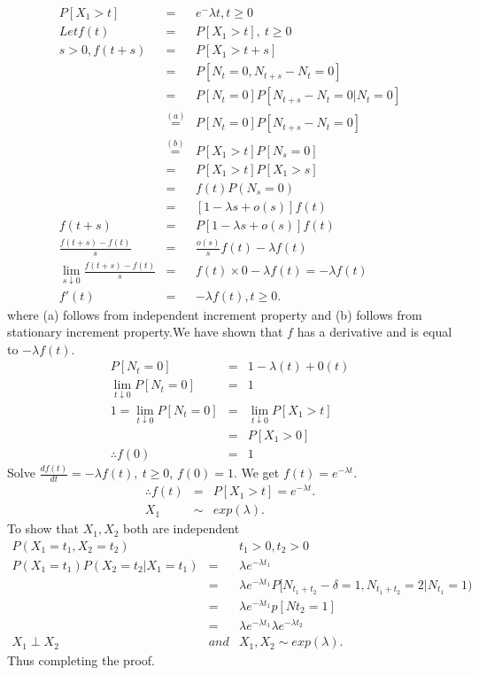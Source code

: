 \documentclass[11 pt]{article}
\theoremstyle{plain}
\theoremstyle{definition}
\theoremstyle{remark}
\begin{document}
\begin{eqnarray*}
  P[X_{1}>t] &=&  e^-\lambda t, t\geq 0\\
  Let f(t) &=& P[X_{1}>t],~ t\geq 0 \\
  s>0, f(t+s) &=&   P[X_{1}>t+s]\\
   &=& P[N_{t}=0, N_{t+s}-N_{t}=0]  \\
   &=& P[N_{t}=0] P[N_{t+s}-N_{t}=0|N_{t}=0 ] \\
   &\stackrel{(a)}{=}& P[N_{t}=0] P[ N_{t+s}-N_{t}=0]\\
   &\stackrel{(b)}{=}&  P[X_{1}>t] P[N_{s}=0]  \\
   &=& P[X_{1}>t] P[X_{1}>s] \\
   &=& f(t) P(N_{s}=0) \\
   &=& [1- \lambda s + o(s)] f(t) \\
  f(t+s) &=& P [1- \lambda s + o(s)] f(t)\\
  \frac{f(t+s)-f(t)}{s} &=& \frac{o(s)}{s}f(t)- \lambda f(t) \\
  \lim_{s\downarrow0}  \frac{f(t+s)-f(t)}{s}  &=& f(t) \times 0 - \lambda f(t) = -\lambda f(t) \\
 f'(t) &=& - \lambda f(t), t\geq 0.
\end{eqnarray*}
where (a) follows from independent increment property and (b) follows from stationary increment property.We have shown that $f$ has a derivative and is equal to $-\lambda f(t)$.\\
\begin{eqnarray*}
   P[N_{t}=0] &=& 1- \lambda (t)+ 0(t) \\
  \lim _{t\downarrow0}P[N_{t}=0] &=& 1 \\
  1= \lim _{t\downarrow0}P[N_{t}=0]&=& \lim _{t\downarrow0}P[X_{1}>t] \\
   &=& P[X_{1}>0]  \\
  \therefore f(0) &=& 1
  \end{eqnarray*}
  Solve $\frac{df(t)}{dt} = -\lambda f(t), ~t\geq 0$, $f(0)= 1$. We get $f(t) = e^{-\lambda t}$.
   \begin{eqnarray*}
  \therefore f(t) &=&  P[X_{1}>t]= e^{-\lambda t}.\\
  X_{1}&\sim & exp (\lambda ).
\end{eqnarray*}
To show that $X_{1}, X_{2}$ both are independent\\
\begin{eqnarray*}
 P(X_{1}=t_{1}, X_{2}=t_{2}) && t_{1} >0, t_{2}>0\\
  P(X_{1}=t_{1})P (X_{2}=t_{2}| X_{1}=t_{1})&=& \lambda e^{-\lambda t_{1}} \\
   &=& \lambda e^{-\lambda t_{1}} P[N_{t_{1}+t_{2}}-\delta=1,N_{t_{1}+t_{2}}=2|N_{t_{1}}=1) \\
   &=& \lambda e^{-\lambda t_{1}} p[Nt_{2}=1] \\
   &=& \lambda e^{-\lambda t_{1}} \lambda e^{-\lambda t_{2}}  \\
   X_{1} \perp X_{2}&and & X_{1}, X_{2} \sim exp (\lambda).
\end{eqnarray*}
Thus completing the proof. 
\end{document}
